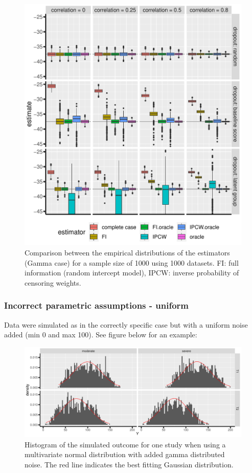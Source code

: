 \documentclass[12pt]{article}
\begin{document}
\begin{figure}[!h]
\centering
\includegraphics[width=\textwidth]{./figures/simStudy-bias-gamma.pdf}
\caption{\label{fig:simulationGaussian}Comparison between the empirical distributions of the estimators (Gamma case) for a sample size of 1000 using 1000 datasets. FI: full information (random intercept model), IPCW: inverse probability of censoring weights.}
\end{figure}

\clearpage

\subsubsection{Incorrect parametric assumptions - uniform}
\label{sec:org9d815a6}


Data were simulated as in the correctly specific case but with a
uniform noise added (min 0 and max 100). See figure below for an
example:
\begin{figure}[!h]
\centering
\includegraphics[trim={0 0 0 0},width=1\textwidth]{./figures/simStudy-unif-hist.pdf}
\caption{\label{fig:student-hist}Histogram of the simulated outcome for one study when using a multivariate normal distribution with added gamma distributed noise. The red line indicates the best fitting Gaussian distribution.}
\end{figure}
\end{document}
